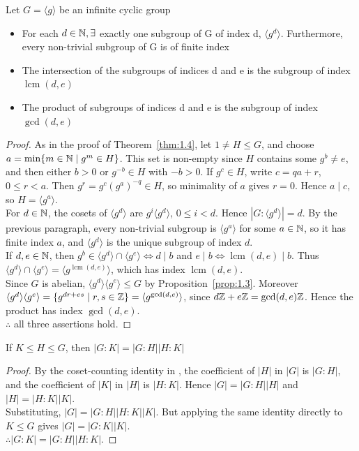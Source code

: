 \documentclass[../Odyssey_Project.tex]{subfiles}
\begin{document}
\begin{theorem}
\label{thm:1.5}
Let \(G = \langle g \rangle \) be an infinite cyclic group
\begin{itemize}
    \item For each \(d \in \mathbb{N}, \exists \) exactly one subgroup of G of index d, \(\langle g^d \rangle \). Furthermore, every non-trivial subgroup of G is of finite index
    \item The intersection of the subgroups of indices d and e is the subgroup of index \(\operatorname{lcm}(d,e)\)
    \item The product of subgroups of indices d and e is the subgroup of index \(\gcd(d,e)\)
\end{itemize}
\end{theorem}
\begin{proof}
    As in the proof of Theorem~\ref{thm:1.4}, let \(1 \ne H \leq G\), and choose \(a = \min\{m \in \mathbb{N} \mid g^m \in H\}\). This set is non-empty since \(H\) contains some \(g^b \ne e\), and then either \(b > 0\) or \(g^{-b} \in H\) with \(-b > 0\). If \(g^c \in H\), write \(c = qa+r\), \(0 \leq r < a\). Then \(g^r = g^c(g^a)^{-q} \in H\), so minimality of \(a\) gives \(r = 0\). Hence \(a \mid c\), so \(H = \langle g^a\rangle\). \\
    For \(d \in \mathbb{N}\), the cosets of \(\langle g^d\rangle\) are \(g^i\langle g^d\rangle\), \(0 \leq i < d\). Hence \(|G:\langle g^d\rangle| = d\). By the previous paragraph, every non-trivial subgroup is \(\langle g^a\rangle\) for some \(a \in \mathbb{N}\), so it has finite index \(a\), and \(\langle g^d\rangle\) is the unique subgroup of index \(d\). \\
    If \(d,e \in \mathbb{N}\), then \(g^b \in \langle g^d\rangle \cap \langle g^e\rangle \iff d \mid b\) and \(e \mid b \iff \operatorname{lcm}(d,e) \mid b\). Thus \(\langle g^d\rangle \cap \langle g^e\rangle = \langle g^{\operatorname{lcm}(d,e)}\rangle\), which has index \(\operatorname{lcm}(d,e)\). \\
    Since \(G\) is abelian, \(\langle g^d\rangle\langle g^e\rangle \leq G\) by Proposition~\ref{prop:1.3}. Moreover \(\langle g^d\rangle\langle g^e\rangle = \{g^{dr+es} \mid r,s \in \mathbb{Z}\} = \langle g^{\gcd(d,e)}\rangle\), since \(d\mathbb{Z} + e\mathbb{Z} = \gcd(d,e)\mathbb{Z}\). Hence the product has index \(\gcd(d,e)\). \\
    \(\therefore\) all three assertions hold.
\end{proof}

\begin{theorem}
\label{thm:1.6}
If \(K \leq H \leq G\), then \(|G:K| = |G:H| |H:K|\)
\end{theorem}
\begin{proof}
    By the coset-counting identity in , the coefficient of \(|H|\) in \(|G|\) is \(|G:H|\), and the coefficient of \(|K|\) in \(|H|\) is \(|H:K|\). Hence \(|G| = |G:H||H|\) and \(|H| = |H:K||K|\). \\
    Substituting, \(|G| = |G:H||H:K||K|\). But applying the same identity directly to \(K \leq G\) gives \(|G| = |G:K||K|\). \\
    \(\therefore |G:K| = |G:H||H:K|\).
\end{proof}
\end{document}
